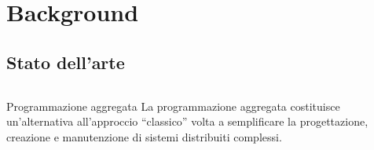 \section{Background}
  \subsection{Stato dell'arte}

    \begin{frame}{\insertsectionhead}{\insertsubsectionhead}
      \begin{columns}
        \begin{column}{.7\textwidth}
          \begin{block}{Programmazione aggregata}
            La programmazione aggregata costituisce un'alternativa all'approccio ``classico'' volta a semplificare la progettazione, creazione e manutenzione di sistemi distribuiti complessi.
          \end{block}


\end{column}
\end{columns}
\end{frame}
